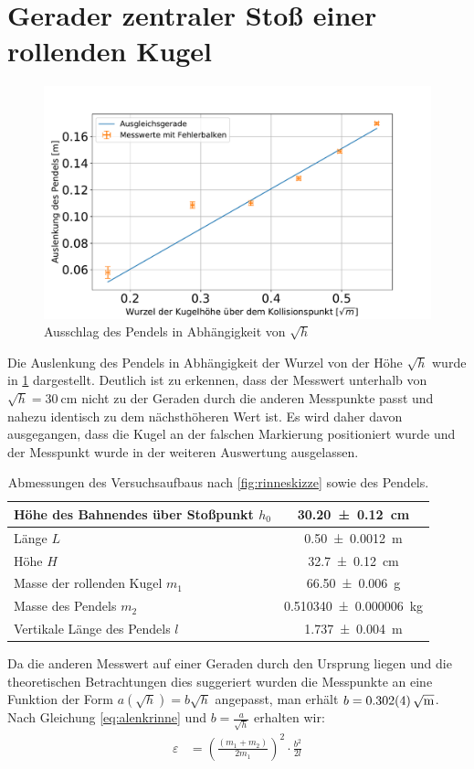 \section[Rollende Kugel]{Gerader zentraler Stoß einer rollenden Kugel}\label{kap:roll}



\begin{figure}[h!]
	\centering
	\includegraphics[width=0.7\linewidth]{res/Rinne}
	\caption{Ausschlag des Pendels in Abhängigkeit von $\sqrt{h}$}
	\label{fig:rinne}
\end{figure}

Die Auslenkung des Pendels in Abhängigkeit der Wurzel von der Höhe $\sqrt{h}$ wurde in \cref{fig:rinne} dargestellt. Deutlich ist zu erkennen, dass der Messwert unterhalb von $\sqrt{h}=\SI{30}{\centi\metre}$ nicht zu der Geraden durch die anderen Messpunkte passt und nahezu identisch zu dem nächsthöheren Wert ist. Es wird daher davon ausgegangen, dass die Kugel an der falschen Markierung positioniert wurde und der Messpunkt wurde in der weiteren Auswertung ausgelassen.
\begin{table}
	\caption{Abmessungen des Versuchsaufbaus nach \cref{fig:rinneskizze} sowie des Pendels.}

\begin{tabular}{|l|c|}
	\hline 
	Höhe des Bahnendes über Stoßpunkt $h_0$ & \SI{30.20+-0.12}{cm}  \\ 
	\hline 
	Länge $L$ & \SI{0.50+-0.0012}{\metre}  \\ 
		\hline 
	Höhe $H$&  \SI{32.7+-0.12}{\centi \meter}\\ 
	\hline
	Masse der rollenden Kugel $m_1$& \SI{66.50 \pm 0,006}{\gram}  \\ 
	\hline 
	Masse des Pendels $m_2$ & \SI{0.510340+-0.000006}{\kilogram} \\  
	\hline
	Vertikale Länge des Pendels $l$ & \SI{1.737+-0.004}{\metre}  \\ 
	\hline 
\end{tabular} 
\label{tab:messwrinne}
\end{table}
Da die anderen Messwert auf einer Geraden durch den Ursprung liegen und die theoretischen Betrachtungen dies suggeriert wurden die Messpunkte an eine Funktion der Form $a(\sqrt{h})=b \sqrt{h}$ angepasst, man erhält $b=\SI{0.302+-0.004}{\sqrt{\metre}}$. Nach Gleichung \ref{eq:alenkrinne} und $b=\frac{a}{\sqrt{h}}$ erhalten wir:
\begin{align}
\varepsilon&=\left( \frac{(m_1+m_2)}{2m_1} \right) ^2 \cdot \frac{b^2}{2l}\\
\end{align}

